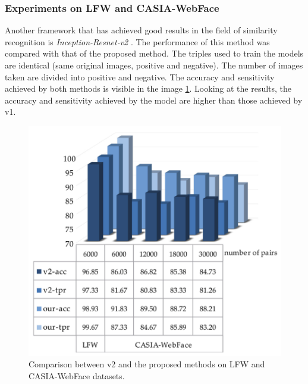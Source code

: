 \subsubsection{Experiments on LFW and CASIA-WebFace}
Another framework that has achieved good results in the field of similarity 
recognition is \emph{Inception-Resnet-v2} \cite{0902694022}. The performance of this method was 
compared with that of the proposed method. The triples used to train the 
models are identical (same original images, positive and negative). The number 
of images taken are divided into positive and negative. The accuracy and 
sensitivity achieved by both methods is visible in the image \ref{fig:compareV2}. Looking at 
the results, the accuracy and sensitivity achieved by the model are higher 
than those achieved by v1.
\begin{figure}[h!]
    \centering
    \includegraphics[width = 0.8\linewidth]{images/paper9/comparisonV2.png}
    \centering
    \caption{Comparison between v2 and the proposed methods on LFW and CASIA-WebFace datasets.}
    \label{fig:compareV2}
\end{figure}

